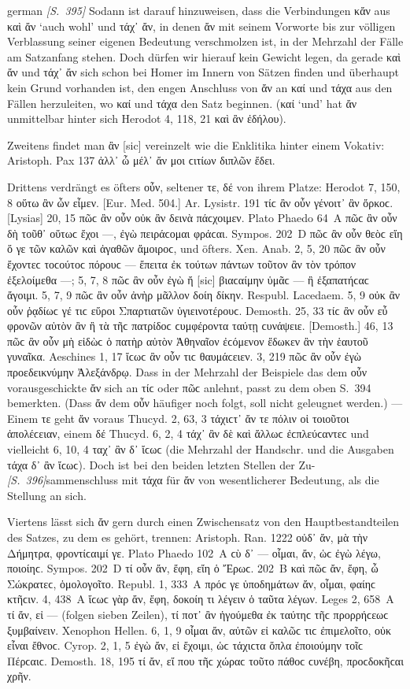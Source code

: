 \begin{otherlanguage*}{german}
\newpage
\hypertarget{p395}{\emph{[S.~395]}}\label{p395} Sodann ist darauf hinzuweisen, dass die Verbindungen κἄν aus καὶ ἄν ‘auch wohl’ und τάχ᾽ ἄν, in denen ἄν mit seinem Vorworte bis zur völligen Verblassung seiner eigenen Bedeutung verschmolzen ist, in der Mehrzahl der Fälle am Satzanfang stehen. Doch dürfen wir hierauf kein Gewicht legen, da gerade καὶ ἄν und τάχ᾽ ἄν sich schon bei Homer im Innern von Sätzen finden und überhaupt kein Grund vorhanden ist, den engen Anschluss von ἄν an καί und τάχα aus den Fällen herzuleiten, wo καί und τάχα den Satz beginnen. (καί ‘und’ hat ἄν unmittelbar hinter sich Herodot 4, 118, 21 καὶ ἂν ἐδήλου).

Zweitens findet man ἂν [sic] vereinzelt wie die Enklitika hinter einem Vokativ: Aristoph. Pax 137 ἀλλ᾽ ὦ μέλ᾽ ἄν μοι ϲιτίων διπλῶν ἔδει.

Drittens verdrängt es öfters οὖν, seltener τε, δέ von ihrem Platze: Herodot 7, 150, 8 οὕτω ἂν ὦν εἶμεν. [Eur. Med. 504.] Ar. Lysistr. 191 τίϲ ἂν οὖν γένοιτ᾽ ἂν ὄρκοϲ. [Lysias] 20, 15 πῶϲ ἂν οὖν οὐκ ἂν δεινὰ πάϲχοιμεν. Plato Phaedo 64~Α πῶϲ ἂν οὖν δὴ τοῦθ᾽ οὕτωϲ ἔχοι —, ἐγὼ πειράϲομαι φράϲαι. Sympos. 202~D πῶϲ ἂν οὖν θεὸϲ εἴη ὅ γε τῶν καλῶν καὶ ἀγαθῶν ἄμοιροϲ, und öfters. Xen. Anab. 2, 5, 20 πῶϲ ἂν οὖν ἔχοντεϲ τοϲούτοϲ πόρουϲ — ἔπειτα ἐκ τούτων πάντων τοῦτον ἂν τὸν τρόπον ἐξελοίμεθα —; 5, 7, 8 πῶϲ ἂν οὖν ἐγὼ ἤ [sic] βιαϲαίμην ὑμᾶϲ — ἢ ἐξαπατήϲαϲ ἄγοιμι. 5, 7, 9 πῶϲ ἂν οὖν ἀνὴρ μᾶλλον δοίη δίκην. Respubl. Lacedaem. 5, 9 οὐκ ἂν οὖν ῥᾳδίωϲ γέ τιϲ εὕροι Σπαρτιατῶν ὑγιεινοτέρουϲ. Demosth. 25, 33 τίϲ ἂν οὖν εὖ φρονῶν αὑτὸν ἂν ἢ τὰ τῆϲ πατρίδοϲ ϲυμφέροντα ταύτῃ ϲυνάψειε. [Demosth.] 46, 13 πῶϲ ἂν οὖν μὴ εἰδὼϲ ὁ πατὴρ αὐτὸν Ἀθηναῖον ἐϲόμενον ἔδωκεν ἂν τὴν ἑαυτοῦ γυναῖκα. Aeschines 1, 17 ἴϲωϲ ἂν οὖν τιϲ θαυμάϲειεν. 3, 219 πῶϲ ἂν οὖν ἐγὼ προεδεικνύμην Ἀλεξάνδρῳ. Dass in der Mehrzahl der Beispiele das dem οὖν vorausgeschickte ἄν sich an τίϲ oder πῶϲ anlehnt, passt zu dem oben S.~394 bemerkten. (Dass ἄν dem οὖν häufiger noch folgt, soll nicht geleugnet werden.) — Einem τε geht ἄν voraus Thucyd. 2, 63, 3 τάχιϲτ᾽ ἄν τε πόλιν οἱ τοιοῦτοι ἀπολέϲειαν, einem δέ Thucyd. 6, 2, 4 τάχ᾽ ἂν δὲ καὶ ἄλλωϲ ἐϲπλεύϲαντεϲ und vielleicht 6, 10, 4 ταχ᾽ ἂν δ᾽ ἴϲωϲ (die Mehrzahl der Handschr. und die Ausgaben τάχα δ᾽ ἂν ἴϲωϲ). Doch ist bei den beiden letzten Stellen der Zu-\hypertarget{p396}{\emph{[S.~396]}}\label{p396}sammenschluss mit τάχα für ἄν von wesentlicherer Bedeutung, als die Stellung an sich.

Viertens lässt sich ἄν gern durch einen Zwischensatz von den Hauptbestandteilen des Satzes, zu dem es gehört, trennen: Aristoph. Ran. 1222 οὐδ᾽ ἄν, μὰ τὴν Δήμητρα, φροντίϲαιμί γε. Plato Phaedo 102~A ϲὺ δ᾽ — οἶμαι, ἄν, ὡϲ ἐγὼ λέγω, ποιοίηϲ. Sympos. 202~D τί οὖν ἄν, ἔφη, εἴη ὁ Ἔρωϲ. 202~Β καὶ πῶϲ ἄν, ἔφη, ὦ Σώκρατεϲ, ὁμολογοῖτο. Republ. 1, 333~Α πρόϲ γε ὑποδημάτων ἄν, οἶμαι, φαίηϲ κτῆϲιν. 4, 438~A ἴϲωϲ γὰρ ἄν, ἔφη, δοκοίη τι λέγειν ὁ ταῦτα λέγων. Leges 2, 658~Α τί ἄν, εἰ — (folgen sieben Zeilen), τί ποτ᾽ ἂν ἡγούμεθα ἐκ ταύτηϲ τῆϲ προρρήϲεωϲ ξυμβαίνειν. Xenophon Hellen. 6, 1, 9 οἶμαι ἄν, αὐτῶν εἰ καλῶϲ τιϲ ἐπιμελοῖτο, οὐκ εἶναι ἔθνοϲ. Cyrop. 2, 1, 5 ἐγὼ ἄν, εἰ ἔχοιμι, ὡϲ τάχιϲτα ὅπλα ἐποιούμην τοῖϲ Πέρϲαιϲ. Demosth. 18, 195 τί ἄν, εἴ που τῆϲ χώραϲ τοῦτο πάθοϲ ϲυνέβη, προϲδοκῆϲαι χρῆν.


\end{otherlanguage*}
